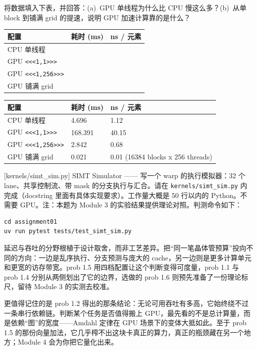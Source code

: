 \documentclass[11pt,a4paper,fontset=none]{ctexart}
\begin{document}
将数据填入下表，并回答：(a)~GPU 单线程为什么比 CPU 慢这么多？(b)~从单 block 到铺满 grid 的提速，说明 GPU 加速计算靠的是什么？

\begin{center}\small
\begin{tabular}{@{}lll@{}}
\toprule
配置 & 耗时 (ms) & ns / 元素 \\
\midrule
CPU 单线程 & & \\
GPU \texttt{<<<1,1>>>} & & \\
GPU \texttt{<<<1,256>>>} & & \\
GPU 铺满 grid & & \\
\bottomrule
\end{tabular}
\end{center}

\begin{answer}
\begin{center}\small
\begin{tabular}{@{}lll@{}}
\toprule
配置 & 耗时 (ms) & ns / 元素 \\
\midrule
CPU 单线程 & 4.696 & 1.12 \\
GPU \texttt{<<<1,1>>>} & 168.391 & 40.15 \\
GPU \texttt{<<<1,256>>>} & 2.842 & 0.68 \\
GPU 铺满 grid & 0.021 & 0.01 (16384 blocks x 256 threads) \\
\bottomrule
\end{tabular}
\end{center}
\end{answer}

[kernels/simt\_sim.py]
SIMT Simulator —— 写一个 warp 的执行模拟器：32 个 lane、共享控制流、带 mask 的分支执行与汇合。请在 \texttt{kernels/simt\_sim.py} 内完成（docstring 里面有具体实现要求）。工作量大概是 50 行以内的 Python。不需要 GPU。注：本题为 Module 3 的实验结果提供理论对照。判测命令如下：

\begin{lstlisting}
cd assignment01
uv run pytest tests/test_simt_sim.py
\end{lstlisting}

\begin{lookback}
延迟与吞吐的分野根植于设计取舍，而非工艺差异。把“同一笔晶体管预算”投向不同的方向：一边是乱序执行、分支预测与庞大的 cache，另一边则是更多计算单元和更宽的访存带宽。prob 1.5 用四档配置让这个判断变得可度量，prob 1.1 与 prob 1.4 分别从两侧划出了它的边界，选做的 prob 1.6 则预先准备了一份理论标尺，留待 Module 3 的实测去校准。

更值得记住的是 prob 1.2 得出的那条结论：无论可用吞吐有多高，它始终绕不过一条串行依赖链。判断某个任务是否值得搬上 GPU，最先看的不是总计算量，而是依赖“图”的宽度——Amdahl 定律在 GPU 场景下的变体大抵如此。至于 prob 1.5 的那份向量加法，它几乎榨不出这块卡真正的算力，真正的瓶颈藏在另一个地方；Module 4 会为你把它量化出来。
\end{lookback}
\end{document}
